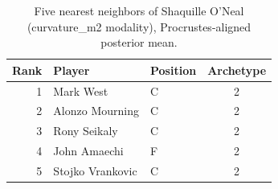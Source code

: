 \begin{table}[htbp]
  \centering\small
  \begin{tabular}{rllc}
    \toprule
    Rank & Player & Position & Archetype \\
    \midrule
    1 & Mark West & C & 2 \\
    2 & Alonzo Mourning & C & 2 \\
    3 & Rony Seikaly & C & 2 \\
    4 & John Amaechi & F & 2 \\
    5 & Stojko Vrankovic & C & 2 \\
    \bottomrule
  \end{tabular}
  \caption{Five nearest neighbors of Shaquille O'Neal (curvature_m2 modality), Procrustes-aligned posterior mean.}
  \label{tab:Shaquille_O_Neal_neighbors_curvature_m2}
\end{table}


